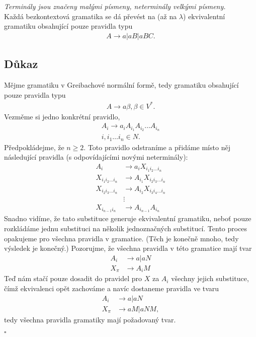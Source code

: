 \documentclass{scrartcl}
\begin{document}
 
\textit{Terminály jsou značeny malými písmeny, neterminály velkými písmeny.}\\

Každá bezkontextová gramatika se dá převést na (až na $\lambda$) ekvivalentní gramatiku obsahující pouze pravidla typu
\begin{align*}
        A \rightarrow a \vert aB \vert aBC.
\end{align*}

\subsection*{Důkaz}
Mějme gramatiku v Greibachové normální formě, tedy gramatiku obsahující pouze pravidla typu 
\begin{align*}
        A \rightarrow a\beta, \beta \in V^*.
\end{align*}
Vezměme si jedno konkrétní pravidlo,
\begin{align*}
        A_i \rightarrow a_iA_{i_1}A_{i_2}\dots A_{i_n}\\ i, i_1 \dots i_n \in N.
\end{align*}
Předpokládejme, že $n \geq 2$. Toto pravidlo odstraníme a přidáme místo něj následující pravidla (s odpovídajícími novými neterminály):
\begin{align*}
        A_i &\rightarrow a_iX_{i_1i_2\dots i_n}\\
        X_{i_1i_2\dots i_n} &\rightarrow A_{i_1}X_{i_2i_3\dots i_n}\\
        X_{i_2i_3\dots i_n} &\rightarrow A_{i_2}X_{i_3i_4\dots i_n}\\
        &\vdots \\
        X_{i_{n-1}i_n} &\rightarrow A_{i_{n-1}}A_{i_n}
\end{align*}
Snadno vidíme, že tato substituce generuje ekvivalentní gramatiku, neboť pouze rozkládáme jednu substituci na několik jednoznačných substitucí. Tento proces opakujeme pro všechna pravidla v gramatice. (Těch je konečně mnoho, tedy výsledek je konečný.) Pozorujme, že všechna pravidla v této gramatice mají tvar
\begin{align*}
        A_i &\rightarrow a \vert aN \\
        X_\pi &\rightarrow A_iM
\end{align*}
Teď nám stačí pouze dosadit do pravidel pro $X$ za $A_i$ všechny jejich substituce, čímž ekvivalenci opět zachováme a navíc dostaneme pravidla ve tvaru
\begin{align*}
        A_i &\rightarrow a \vert aN \\
        X_\pi &\rightarrow aM \vert aNM,
\end{align*}
tedy všechna pravidla gramatiky mají požadovaný tvar.
\begin{flushright}
        $\square$
\end{flushright}
\end{document}
